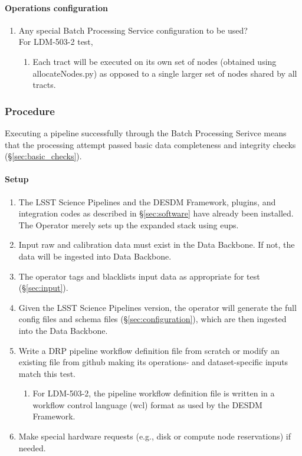 \paragraph{Operations configuration}
\begin{enumerate}
    \item{Any special Batch Processing Service configuration to be used?} \\
    For LDM-503-2 test,
    \begin{enumerate}
        \item{Each tract will be executed on its own set of nodes (obtained using allocateNodes.py) as opposed to a single larger set of nodes shared by all tracts.}
    \end{enumerate}

\end{enumerate}

\subsubsection{Procedure}

Executing a pipeline successfully through the Batch Processing
Serivce means that the processing attempt passed basic data
completeness and integrity checks (\S\ref{sec:basic_checks}).

\paragraph{Setup}
\begin{enumerate}
  \item{The LSST Science Pipelines and the DESDM Framework, plugins, and integration codes as described in \S\ref{sec:software} have already been installed.   The Operator merely sets up the expanded stack using eups.}
  \item{Input raw and calibration data must exist in the Data Backbone. If not, the data will be ingested into Data Backbone.}
  \item{The operator tags and blacklists input data as appropriate for test (\S\ref{sec:input}).}
  \item{Given the LSST Science Pipelines version, the operator will generate the full config files and schema files (\S\ref{sec:configuration}), which are then ingested into the Data Backbone.}

  \item{Write a DRP pipeline workflow definition file from scratch or modify an existing file from github making its operations- and dataset-specific inputs match this test.}

  \begin{enumerate}
    \item{For LDM-503-2, the pipeline workflow definition file is written in a workflow control language (wcl) format as used by the DESDM Framework.}
  \end{enumerate}
  \item{Make special hardware requests (e.g., disk or compute node reservations) if needed.}
\end{enumerate}

